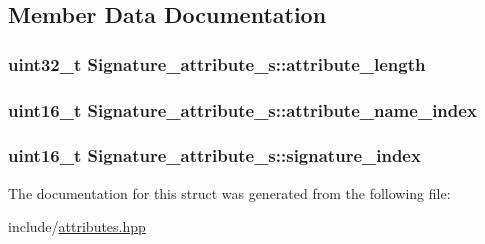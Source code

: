 \subsection{Member Data Documentation}
\hypertarget{structSignature__attribute__s_a4a57dffe751f28ffe046dfdefe4a46fd}{
\subsubsection[{attribute\+\_\+length}]{\setlength{\rightskip}{0pt plus 5cm}uint32\+\_\+t Signature\+\_\+attribute\+\_\+s\+::attribute\+\_\+length}}\label{structSignature__attribute__s_a4a57dffe751f28ffe046dfdefe4a46fd}
\hypertarget{structSignature__attribute__s_a6c63cbbb5e2570691c9ae328440ae58f}{
\subsubsection[{attribute\+\_\+name\+\_\+index}]{\setlength{\rightskip}{0pt plus 5cm}uint16\+\_\+t Signature\+\_\+attribute\+\_\+s\+::attribute\+\_\+name\+\_\+index}}\label{structSignature__attribute__s_a6c63cbbb5e2570691c9ae328440ae58f}
\hypertarget{structSignature__attribute__s_a8c7f7f5f3002f25e5bfa1b637000433d}{
\subsubsection[{signature\+\_\+index}]{\setlength{\rightskip}{0pt plus 5cm}uint16\+\_\+t Signature\+\_\+attribute\+\_\+s\+::signature\+\_\+index}}\label{structSignature__attribute__s_a8c7f7f5f3002f25e5bfa1b637000433d}


The documentation for this struct was generated from the following file\+:\begin{DoxyCompactItemize}
\item 
include/\hyperlink{attributes_8hpp}{attributes.\+hpp}\end{DoxyCompactItemize}
